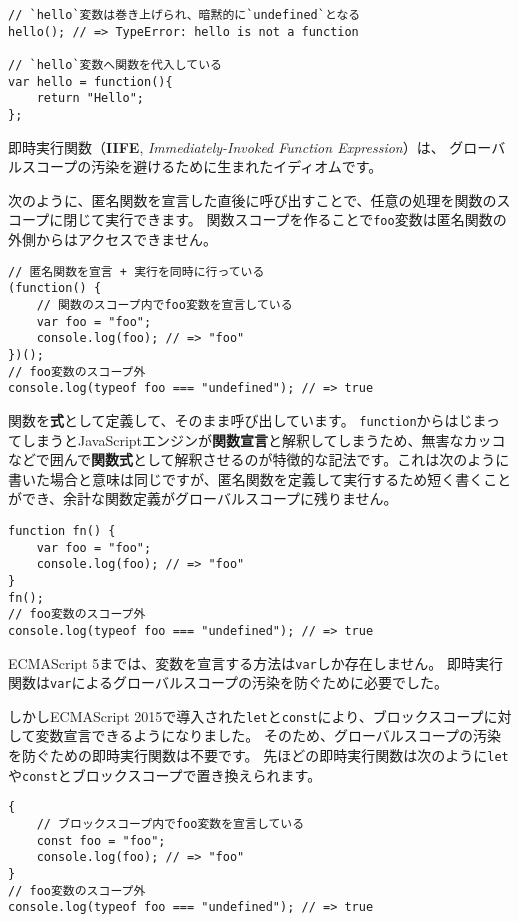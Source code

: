\begin{lstlisting}
// `hello`変数は巻き上げられ、暗黙的に`undefined`となる
hello(); // => TypeError: hello is not a function

// `hello`変数へ関数を代入している
var hello = function(){
    return "Hello";
};
\end{lstlisting}

\begin{tcolorbox}[title=即時実行関数]\label{immediate-function}

即時実行関数（\textbf{IIFE}, \emph{Immediately-Invoked Function
Expression}）は、
グローバルスコープの汚染を避けるために生まれたイディオムです。

次のように、匿名関数を宣言した直後に呼び出すことで、任意の処理を関数のスコープに閉じて実行できます。
関数スコープを作ることで\texttt{foo}変数は匿名関数の外側からはアクセスできません。

\begin{lstlisting}
// 匿名関数を宣言 + 実行を同時に行っている
(function() {
    // 関数のスコープ内でfoo変数を宣言している
    var foo = "foo";
    console.log(foo); // => "foo"
})();
// foo変数のスコープ外
console.log(typeof foo === "undefined"); // => true
\end{lstlisting}

関数を\textbf{式}として定義して、そのまま呼び出しています。
\texttt{function}からはじまってしまうとJavaScriptエンジンが\textbf{関数宣言}と解釈してしまうため、無害なカッコなどで囲んで\textbf{関数式}として解釈させるのが特徴的な記法です。これは次のように書いた場合と意味は同じですが、匿名関数を定義して実行するため短く書くことができ、余計な関数定義がグローバルスコープに残りません。

\begin{lstlisting}
function fn() {
    var foo = "foo";
    console.log(foo); // => "foo"
}
fn();
// foo変数のスコープ外
console.log(typeof foo === "undefined"); // => true
\end{lstlisting}

ECMAScript
5までは、変数を宣言する方法は\texttt{var}しか存在しません。
即時実行関数は\texttt{var}によるグローバルスコープの汚染を防ぐために必要でした。

しかしECMAScript
2015で導入された\texttt{let}と\texttt{const}により、ブロックスコープに対して変数宣言できるようになりました。
そのため、グローバルスコープの汚染を防ぐための即時実行関数は不要です。
先ほどの即時実行関数は次のように\texttt{let}や\texttt{const}とブロックスコープで置き換えられます。

\begin{lstlisting}
{
    // ブロックスコープ内でfoo変数を宣言している
    const foo = "foo";
    console.log(foo); // => "foo"
}
// foo変数のスコープ外
console.log(typeof foo === "undefined"); // => true
\end{lstlisting}
\end{tcolorbox}

